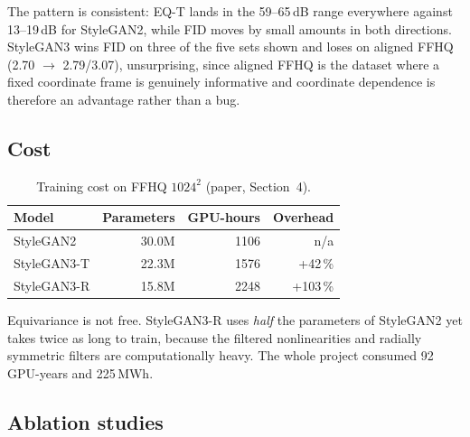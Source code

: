 \documentclass[11pt,a4paper]{article}
\begin{document}
The pattern is consistent: EQ-T lands in the 59--65\,dB range everywhere against
13--19\,dB for StyleGAN2, while FID moves by small amounts in both directions.
StyleGAN3 wins FID on three of the five sets shown and loses on aligned FFHQ
(2.70 $\to$ 2.79/3.07), unsurprising, since aligned FFHQ is the dataset where
a fixed coordinate frame is genuinely informative and coordinate dependence is
therefore an advantage rather than a bug.

\subsection{Cost}

\begin{table}[htbp]
\centering
\caption{Training cost on FFHQ $1024^2$ (paper, Section~4).}
\label{tab:cost}
\small
\begin{tabular}{lrrr}
\toprule
\textbf{Model} & \textbf{Parameters} & \textbf{GPU-hours} & \textbf{Overhead} \\
\midrule
StyleGAN2    & 30.0M & 1106 & n/a \\
StyleGAN3-T  & 22.3M & 1576 & +42\,\% \\
StyleGAN3-R  & 15.8M & 2248 & +103\,\% \\
\bottomrule
\end{tabular}
\end{table}

Equivariance is not free. StyleGAN3-R uses \emph{half} the parameters of
StyleGAN2 yet takes twice as long to train, because the filtered nonlinearities
and radially symmetric filters are computationally heavy. The whole project
consumed 92 GPU-years and 225\,MWh.

\subsection{Ablation studies}
\end{document}
